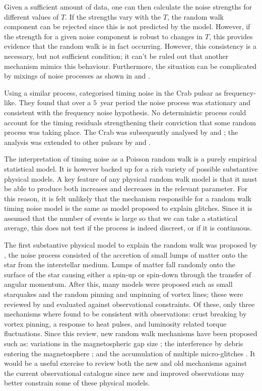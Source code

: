 Given a sufficient amount of data, one can then calculate the noise strengths
for different values of $T$. If the strengths vary with the $T$, the random
walk component can be rejected since this is not predicted by the model.
However, if the strength for a given noise component is robust to changes in
$T$, this provides evidence that the random walk is in fact occurring.  However,
this consistency is a necessary, but not sufficient condition; it can't be
ruled out that another mechanism mimics this behaviour. Furthermore, the
situation can be complicated by mixings of noise processes as shown in
\citet{Groth1975} and \citet{Cordes1980}.

Using a similar process, \citet{Boynton1972} categorised timing noise in the
Crab pulsar as frequency-like. They found that over a $5$~year period
the noise process was stationary and consistent with the frequency noise
hypothesis. No deterministic process could account for the timing residuals
strengthening their conviction that some random process was taking place. The
Crab was subsequently analysed by \citet{Groth1975} and \citet{Cordes1980}; the
analysis was extended to other pulsars by \citet{Helfand1980} and
\citet{CordesHelfand1980}.

The interpretation of timing noise as a Poisson random walk is a purely
empirical statistical model. It is however backed up for a rich variety of
possible substantive physical models.  A key feature of any physical random
walk model is that it must be able to produce both increases and decreases in
the relevant parameter. For this reason, it is felt unlikely that the mechanism
responsible for a random walk timing noise model is the same as model proposed
to explain glitches. Since it is assumed that the number of events
is large so that we can take a statistical average, this does not test if the
process is indeed discreet, or if it is continuous.

The first substantive physical model to explain the random walk was proposed by
\citet{Boynton1972}, the noise process consisted of the accretion of small
lumps of matter onto the star from the interstellar medium. Lumps of matter fall
randomly onto the surface of the star causing either a spin-up or spin-down
through the transfer of angular momentum. After this, many models were proposed
such as small starquakes and the random pinning and unpinning of vortex lines; these
were reviewed by \citet{Cordes1981} and evaluated against observational
constraints. Of these, only three mechanisms where found to be consistent with
observations: crust breaking by vortex pinning, a response to heat pulses, and
luminosity related torque fluctuations. Since this review, new random walk
mechanisms have been proposed such as: variations in the magnetospheric gap
size \citep{Cheng1987}; the interference by debris entering the magnetosphere
\citep{Cordes2008}; and the accumulation of multiple micro-glitches
\citep{Janssen2006}. It would be a useful exercise to review both the new and
old mechanisms against the current observational catalogue since new and
improved observations may better constrain some of these physical models.

